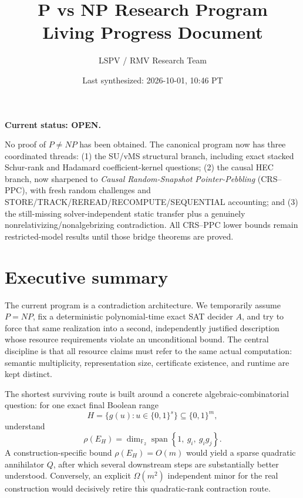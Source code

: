 \documentclass[11pt]{article}
\title{\bfseries P vs NP Research Program\\[0.25em]
\Large Living Progress Document}
\author{LSPV / RMV Research Team}
\date{Last synthesized: 2026-10-01, 10:46 PT}
\newcommand{\statusopen}{\textcolor{openstatus}{\textbf{OPEN}}}
\newcommand{\Ftwo}{\mathbb{F}_2}
\begin{document}
\maketitle
\vspace{-1.0em}

\begin{statusbox}
\textbf{\Large Current status: \statusopen.}

No proof of \(P\neq NP\) has been obtained. The canonical program now has three coordinated
threads: (1) the SU/vMS structural branch, including exact stacked Schur-rank and Hadamard
coefficient-kernel questions; (2) the causal HEC branch, now sharpened to
\emph{Causal Random-Snapshot Pointer-Pebbling} (CRS--PPC), with fresh random challenges and
STORE/TRACK/REREAD/RECOMPUTE/SEQUENTIAL accounting; and (3) the still-missing solver-independent
static transfer plus a genuinely nonrelativizing/nonalgebrizing contradiction. All CRS--PPC
lower bounds remain restricted-model results until those bridge theorems are proved.
\end{statusbox}

\tableofcontents
\newpage

\section{Executive summary}

The current program is a contradiction architecture. We temporarily assume \(P=NP\), fix a
deterministic polynomial-time exact SAT decider \(A\), and try to force that same realization into a
second, independently justified description whose resource requirements violate an unconditional
bound. The central discipline is that all resource claims must refer to the same actual computation:
semantic multiplicity, representation size, certificate existence, and runtime are kept distinct.

The shortest surviving route is built around a concrete algebraic-combinatorial question:
for one exact final Boolean range
\[
H=\{g(u):u\in\{0,1\}^s\}\subseteq \{0,1\}^m,
\]
understand
\[
\boxed{
  \rho(E_H)
  =
  \dim_{\Ftwo}\operatorname{span}
  \left\{
    1,\ g_i,\ g_i g_j
  \right\}.
}
\]
A construction-specific bound \(\rho(E_H)=O(m)\) would yield a sparse quadratic annihilator
\(Q\), after which several downstream steps are substantially better understood. Conversely, an
explicit \(\Omega(m^2)\) independent minor for the real construction would decisively retire this
quadratic-rank contraction route.
\end{document}
